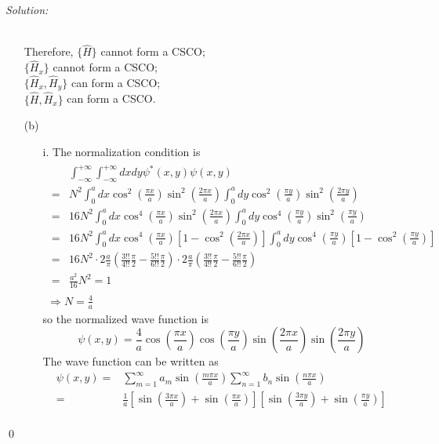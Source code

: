 \documentclass[12pt,a4paper]{article}
\newenvironment{sol}
    {\emph{Solution:}
    }
    {
    \qed
    }
\begin{document}
\begin{sol}
\begin{itemize}
\begin{table}[h]
\end{table}
\\Therefore, $\{\hat{H}\}$ cannot form a CSCO;\\
$\{\hat{H}_x\}$ cannot form a CSCO;\\
$\{\hat{H}_x,\hat{H}_y\}$ can form a CSCO;\\
$\{\hat{H},\hat{H}_x\}$ can form a CSCO.
\item[(b)]
\begin{itemize}
\item[i.] The normalization condition is
\begin{gather}
\begin{align}
\nonumber&\int_{-\infty}^{+\infty}\int_{-\infty}^{+\infty}dxdy\psi^*(x,y)\psi(x,y)\\
\nonumber=&N^2\int_0^adx\cos^2\left(\frac{\pi x}{a}\right)\sin^2\left(\frac{2\pi x}{a}\right)\int_0^ady\cos^2\left(\frac{\pi y}{a}\right)\sin^2\left(\frac{2\pi y}{a}\right)\\
\nonumber=&16N^2\int_0^adx\cos^4\left(\frac{\pi x}{a}\right)\sin^2\left(\frac{2\pi x}{a}\right)\int_0^ady\cos^4\left(\frac{\pi y}{a}\right)\sin^2\left(\frac{\pi y}{a}\right)\\
\nonumber=&16N^2\int_0^adx\cos^4\left(\frac{\pi x}{a}\right)\left[1-\cos^2\left(\frac{2\pi x}{a}\right)\right]\int_0^ady\cos^4\left(\frac{\pi y}{a}\right)\left[1-\cos^2\left(\frac{\pi y}{a}\right)\right]\\
\nonumber=&16N^2\cdot2\frac{a}{\pi}\left(\frac{3!!}{4!!}\frac{\pi}{2}-\frac{5!!}{6!!}\frac{\pi}{2}\right)\cdot2\frac{a}{\pi}\left(\frac{3!!}{4!!}\frac{\pi}{2}-\frac{5!!}{6!!}\frac{\pi}{2}\right)\\
=&\frac{a^2}{16}N^2=1
\end{align}\\
\Longrightarrow N=\frac{4}{a}
\end{gather}
so the normalized wave function is
\begin{equation}
\psi(x,y)=\frac{4}{a}\cos\left(\frac{\pi x}{a}\right)\cos\left(\frac{\pi y}{a}\right)\sin\left(\frac{2\pi x}{a}\right)\sin\left(\frac{2\pi y}{a}\right)
\end{equation}
The wave function can be written as
\begin{align}
\nonumber\psi(x,y)=&\sum_{m=1}^{\infty}a_m\sin\left(\frac{m\pi x}{a}\right)\sum_{n=1}^{\infty}b_n\sin\left(\frac{n\pi x}{a}\right)\\
\nonumber=&\frac{1}{a}\left[\sin\left(\frac{3\pi x}{a}\right)+\sin\left(\frac{\pi x}{a}\right)\right]\left[\sin\left(\frac{3\pi y}{a}\right)+\sin\left(\frac{\pi y}{a}\right)\right]\\

\end{align}
\end{itemize}
\end{itemize}
\end{sol}
\end{document}
